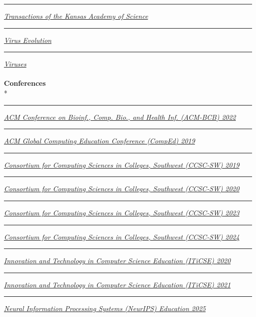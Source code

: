 \documentclass[margin,line]{res}
\begin{document}
\begin{resume}
\rule{-1mm}{5mm} \hspace*{4mm} \href{https://www.kansasacademyscience.org/transactions.html}{\textit{Transactions of the Kansas Academy of Science}}\\
\rule{-1mm}{5mm} \hspace*{4mm} \href{https://academic.oup.com/ve}{\textit{Virus Evolution}}\\
\rule{-1mm}{5mm} \hspace*{4mm} \href{https://www.mdpi.com/journal/viruses}{\textit{Viruses}}\\
~\\
\textbf{Conferences}\\*
\rule{-1mm}{5mm} \hspace*{4mm} \href{https://acm-bcb.org/2022}{\textit{ACM Conference on Bioinf., Comp. Bio., and Health Inf. (ACM-BCB) 2022}}\\
\rule{-1mm}{5mm} \hspace*{4mm} \href{http://www.acmcomped.org/}{\textit{ACM Global Computing Education Conference (CompEd) 2019}}\\
\rule{-1mm}{5mm} \hspace*{4mm} \href{http://www.ccsc.org/southwestern/2019/index.php}{\textit{Consortium for Computing Sciences in Colleges, Southwest (CCSC-SW) 2019}}\\
\rule{-1mm}{5mm} \hspace*{4mm} \href{http://www.ccsc.org/southwestern/2020/index.php}{\textit{Consortium for Computing Sciences in Colleges, Southwest (CCSC-SW) 2020}}\\
\rule{-1mm}{5mm} \hspace*{4mm} \href{http://www.ccsc.org/southwestern/2023/index.php}{\textit{Consortium for Computing Sciences in Colleges, Southwest (CCSC-SW) 2023}}\\
\rule{-1mm}{5mm} \hspace*{4mm} \href{http://www.ccsc.org/southwestern/2024/index.php}{\textit{Consortium for Computing Sciences in Colleges, Southwest (CCSC-SW) 2024}}\\
\rule{-1mm}{5mm} \hspace*{4mm} \href{https://iticse.acm.org/ITiCSE2020}{\textit{Innovation and Technology in Computer Science Education (ITiCSE) 2020}}\\
\rule{-1mm}{5mm} \hspace*{4mm} \href{https://iticse.acm.org/2021}{\textit{Innovation and Technology in Computer Science Education (ITiCSE) 2021}}\\
\rule{-1mm}{5mm} \hspace*{4mm} \href{https://neurips.cc/Conferences/2025}{\textit{Neural Information Processing Systems (NeurIPS) Education 2025}}\\

\end{resume}
\end{document}
